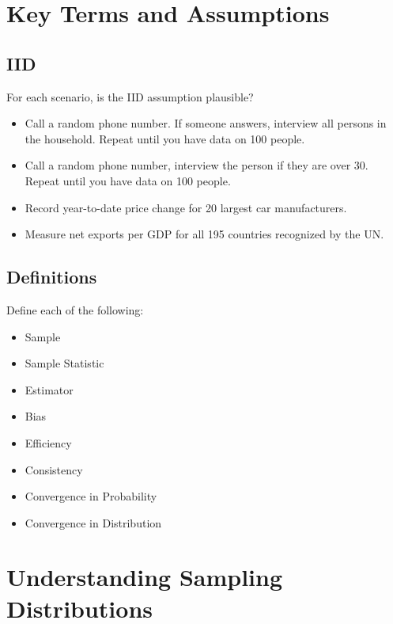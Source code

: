 \documentclass[
]{book}
\providecommand{\tightlist}{%
  \setlength{\itemsep}{0pt}\setlength{\parskip}{0pt}}
\theoremstyle{definition}
\theoremstyle{definition}
\theoremstyle{definition}
\theoremstyle{definition}
\theoremstyle{remark}
\begin{document}
\hypertarget{key-terms-and-assumptions}{%
\section{Key Terms and Assumptions}\label{key-terms-and-assumptions}}

\hypertarget{iid}{%
\subsection{IID}\label{iid}}

For each scenario, is the IID assumption plausible?

\begin{itemize}
\tightlist
\item
  Call a random phone number. If someone answers, interview all persons in the household. Repeat until you have data on 100 people.
\item
  Call a random phone number, interview the person if they are over 30. Repeat until you have data on 100 people.
\item
  Record year-to-date price change for 20 largest car manufacturers.
\item
  Measure net exports per GDP for all 195 countries recognized by the UN.
\end{itemize}

\hypertarget{definitions}{%
\subsection{Definitions}\label{definitions}}

Define each of the following:

\begin{itemize}
\tightlist
\item
  Sample
\item
  Sample Statistic
\item
  Estimator
\item
  Bias
\item
  Efficiency
\item
  Consistency
\item
  Convergence in Probability
\item
  Convergence in Distribution
\end{itemize}

\hypertarget{understanding-sampling-distributions}{%
\section{Understanding Sampling Distributions}\label{understanding-sampling-distributions}}
\end{document}
